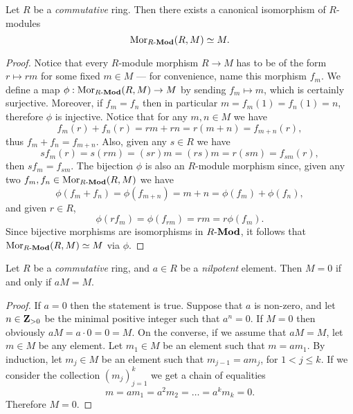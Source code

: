 \begin{proposition}
\label{prop:Mor(R,M)-iso-M-for-commutative-R}
Let \(R\) be a \emph{commutative} ring. Then there exists a canonical
isomorphism of \(R\)-modules
\[
\operatorname{Mor}_{{R\text{-}\textbf{Mod}}}(R, M) \simeq M.
\]
\end{proposition}

\begin{proof}
Notice that every \(R\)-module morphism \(R \to M\) has to be of the form
\(r \mapsto r m\) for some fixed \(m \in M\) --- for convenience, name this
morphism \(f_m\). We define a map \(\phi: \operatorname{Mor}_{{R\text{-}\textbf{Mod}}}(R, M) \to M\) by
sending \(f_m \mapsto m\), which is certainly surjective. Moreover, if
\(f_m = f_n\) then in particular \(m = f_m(1) = f_n(1) = n\), therefore \(\phi\)
is injective. Notice that for any \(m, n \in M\) we have
\[
f_m(r) + f_n(r) = r m + r n = r(m + n) = f_{m + n}(r),
\]
thus \(f_m + f_n = f_{m + n}\). Also, given any \(s \in R\) we have
\[
s f_m(r) = s (r m) = (s r) m = (r s) m = r (s m) = f_{s m}(r),
\]
then \(s f_m = f_{s m}\).  The bijection \(\phi\) is also an \(R\)-module
morphism since, given any two \(f_m, f_n \in \operatorname{Mor}_{{R\text{-}\textbf{Mod}}}(R, M)\) we have
\[
\phi(f_m + f_n) = \phi(f_{m + n}) = m + n = \phi(f_m) + \phi(f_n),
\]
and given \(r \in R\),
\[
\phi(r f_m) = \phi(f_{r m}) = r m = r \phi(f_m).
\]
Since bijective morphisms are isomorphisms in \({R\text{-}\textbf{Mod}}\), it follows that
\(\operatorname{Mor}_{{R\text{-}\textbf{Mod}}}(R, M) \simeq M\) via \(\phi\).
\end{proof}

\begin{lemma}
\label{lem:nakayama-particular-case}
Let \(R\) be a \emph{commutative} ring, and \(a \in R\) be a \emph{nilpotent}
element. Then \(M = 0\) if and only if \(a M = M\).
\end{lemma}

\begin{proof}
If \(a = 0\) then the statement is true. Suppose that \(a\) is non-zero, and let
\(n \in \mathbf{Z}_{>0}\) be the minimal positive integer such that \(a^n = 0\). If
\(M = 0\) then obviously \(a M = a \cdot 0 = 0 = M\). On the converse, if we
assume that \(a M = M\), let \(m \in M\) be any element. Let \(m_1 \in M\) be an
element such that \(m = a m_1\). By induction, let \(m_j \in M\) be an element
such that \(m_{j-1} = a m_j\), for \(1 < j \leq k\). If we consider the
collection \((m_j)_{j=1}^k\) we get a chain of equalities
\[
m = a m_1 = a^2 m_2 = \dots = a^k m_k = 0.
\]
Therefore \(M = 0\).
\end{proof}

